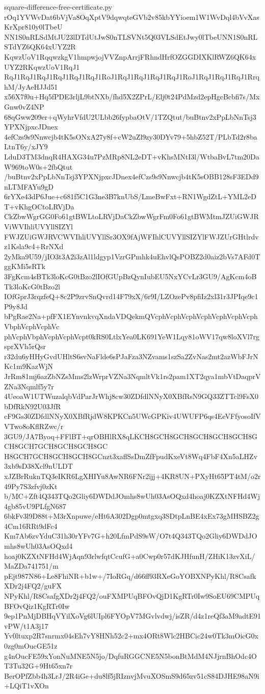 \documentclass[11pt]{article}
\theoremstyle{definition}
\theoremstyle{remark}
\begin{document}
\begin{filecontents*}[overwrite]{square-difference-free-certificate.py}
rOq1YVWvDat6bVjVa8OqXptV9dqwqteGVb2v85kbYYioem1W1WvDql4bVvXasKrXpr810y0lTbeU
NN1S0nRLSdMtJU23lDTdUtJwS0nTLSVNt5Q03VLSdEtJwy0lTbeUNN1S0nRLSTdYZ6QK64xUYZ2R
KqwzUoV1RqqwzkgV1hmpwjojVVZnpArrjFRhndHrfOZGGDIXKlRWZ6QK64xUYZ2RKqwzUoV1RqJ1
RqJ1RqJ1RqJ1RqJ1RqJ1RqJ1RoJ1RqJ1RqJ1RqJ1RqJ1RoJ1RqJ1RqJ1RqJ1RrqhM/JyAeHJJd51
x56X7f0u+Hq5fPDE3rljL9btNXb/fhd5X2ZPrL/Elj0t24PdMzd2epHgcBcbfi7s/MxGnw0vZ4NP
68qGww209er+qWyhrVfdU2ULbb26fypbaOtV/1TZQtut/buBtnv2xPpLbNnTsj3YPXNjpxcJDnex
4efCzs9s9Nnwcjb4tK5sONxA27y8f+cW2uZl9zy30DYv79+5hbZ52T/PLbTd2r8baLtnT6y/xJY9
LduD3TM3dnqR4HAXG34u7PzMRp8NL2eDT+vKhsMNtI3l/WtbaBvL7tm20DaW969toW0s+2fbQtut
/buBtnv2xPpLbNnTsj3YPXNjpxcJDnex4efCzs9s9Nnwcjb4tK5sOBB128sF3EDd9nLTMFAYu9gD
6rYXe43dP6Jue+c681f5C1G3ne3B7knUbS/LmeBwFxt+RN1WgdZtL+YML2eDT+vKhgOCtoLRVjDa
CkZbwWgrGG0Fo61gtBWLtoLRVjDaCkZbwWgrFm0Fo61gtBWMtmJZUiGWJRViWVIhliUVYllSIZYl
FWJZUiGWJRVCWVIhliUVYllSr3OX9fAjWFIhlCUVYllSIZYlFWJZUrGHtlrdvz1Ksla9c4+RrNXd
2yMka9U59/jIO3t3A2i3zAl1ldgyp1VzrGPmhk4uEhvlQsPOBZ2d0aiz2bVs7AFd0TggKMi5sRTk
3FgKcm4sBTk3loKcG0tBzo2lIOfGUpBzQynIubEU5NxYCvLr3GU9/AgKcm4oBTk3loKcG0tBzo2l
IOfGprJ3rqzfeQ+8c2P9zrvSnQvrd14F79xX/6r9I/LZOzePv8pfiIz2xl31r3JPIqe9c1P9y8Jd
bPgRae2Na+pfFX1EYnvnkvqXndaVDQekmQVcphVcphVcphVcphVcphVcphVcphVbphVcphVcphVc
phVcphVbphVcphVcphVcpt0kRS0LtlxYea0LK691YeW1Lqy81oWV17qw8loXVl7rgsprXVh5rQsr
r32du6yHHyGvdUHltS6svNaFlde6sPJaFza3NZvams1szSa2ZvNas2mt2azWbFJrNKc1m9KazWjN
JrRm81mj6azZbNZsMms2lzWrprVZNa3NqmltVk1rs2pam1XT2qya1mbVtDaqprVZNa3Nqmlf5y7r
4UeoaW1UTWuzalqbVdParJrWhj8cw30ZDfdlNNyX0XBfRsN9GQ33ZTTcl9FsX0bDfRkN92U03JfR
cF9Gs30ZDfdlNNyX0XBfRjdW8KPKCn5UWcGPKiv4UWUFP6qs4EeVFfyosoIfVVTwo8oKflRZwc/r
3GU9/JA7Byoq+FFlBT+qrOBHlRX8qLKCH8GCH8GCH8GCH8GCH8GCH8GCH8GCH7GCH8GCH8GCH8GC
H8GCH7GCH8GCH8GCH8GCnzt3xaflSsDmZfFpudKxeVt8Wq4FbF4Xn5aLHZv3xb9sD38Xcl9nULDT
xJZBrRuknTQ3eIKR6LgXHIYu8AwNR6FNr2ijj+4KR8UN+PXyHt65PT4tM/o2r49Py7S3zfvj0zKt
b/MC+Zft4Q343TQo2Gliy6DWDdJOmhs8wUh03AsOQxd4hoaj0KZXtNFHd4Wj4gb85vU9PLfgN687
6bkFv3l9D88t+M3rXnpuwe/eHt6A302Dgp0mtgxq3SDtpLnBE4xEx73gMHSBZ2g4Cm16RRt9dFc4
Km7Ab6zvYduC31h30rYFv7G+h20LfmPdS9sW/O7t4Q343TQo2Gliy6DWDdJOmhs8wUh03AsOQxd4
hoaj0KZXtNFHd4WjAqn93rlwfqtCcufG+a0Cwp0r57dKJHfunH/ZHiK13zvXiL/MaZDa741751/m
pEjt987N86+Le8FhiNR+b1w+/7IoRGq/d66ff93RXeGoYOBXNPyKhl/R8CsafkXDr2j4FQ2/guFX
NPyKhl/R8CsafgXDr2j4FQ2/ouFXMPUqBFOvQjD1KgRTr0Iw9SoEU69CMPUqBFOvQiz1KgRTr0Iw
9ep1PnMjDBHqVYilXoVg6lUIpl6FYOpV7MGvlvdwj/isZR/d4z1reQf3aM9adtE91vPW/t1A3j17
Yv0ltuxp2R7snrmx04sEh7vY8HNh52c2+mx4ORt8Wlc2HBCic24w0Tk3mOicG0x0zg0mOucGE51z
g4nOucFE59xYonNuMNE5N5jo/DqfuRGGCNE5N5bonBtMdM4NJjrnBhOdc4OT3Tu32G+9Ht65xn7r
BerOPfZbb4h3LrJ/2R4iGe+du8lf5jRIznvjMvuXOSmS9d65zv51cS84DJHE98aN9i+LQiT1vXOn

\end{filecontents*}
\end{document}
